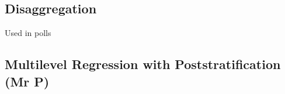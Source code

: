 
\subsection{Disaggregation}

Used in polls

\subsection{Multilevel Regression with Poststratification (Mr P)}


